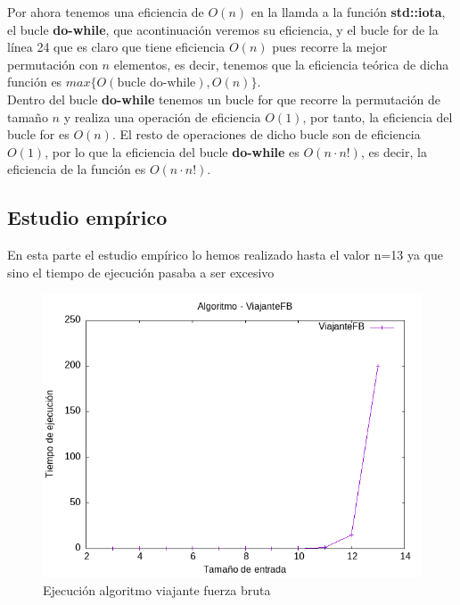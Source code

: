 \documentclass[11pt,openany]{book}
\begin{document}
Por ahora tenemos una eficiencia de $O(n)$ en la llamda a la función \textbf{std::iota}, el bucle \textbf{do-while}, que acontinuación veremos su eficiencia, y el 
bucle for de la línea 24 que es claro que tiene eficiencia $O(n)$ pues recorre la mejor permutación con $n$ elementos, es decir, tenemos que la eficiencia teórica
de dicha función es $max\{O(\text{bucle do-while}), O(n)\}$. \\
Dentro del bucle \textbf{do-while} tenemos un bucle for que recorre la permutación de tamaño $n$ y realiza una operación de eficiencia $O(1)$, por tanto, la eficiencia
del bucle for es $O(n)$. El resto de operaciones de dicho bucle son de eficiencia $O(1)$, por lo que la eficiencia del bucle \textbf{do-while} es $O(n\cdot n!)$, es decir,
la eficiencia de la función es $O(n\cdot n!)$.
\subsection{Estudio empírico}
En esta parte el estudio empírico lo hemos realizado hasta el valor n=13 ya que sino el tiempo de ejecución pasaba a ser excesivo
\begin{center}
      \begin{figure}[H]
                  \centering
                  \includegraphics[width=0.7\linewidth]{assets/Img/ViajanteFB.png}
                  \caption{Ejecución algoritmo viajante fuerza bruta}
                  \label{fig:ViajanteFB}
      \end{figure}
\end{center}
\end{document}
